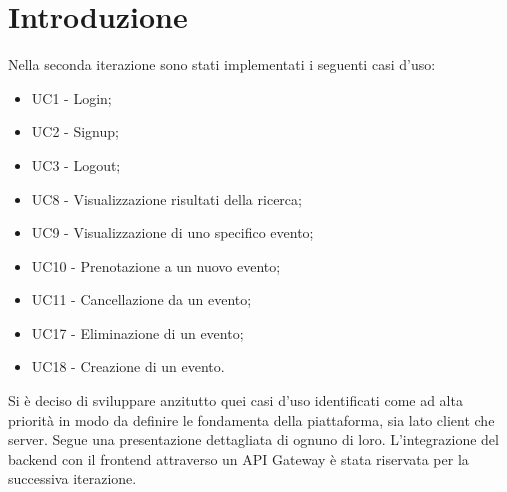 \section{Introduzione}
Nella seconda iterazione sono stati implementati i seguenti casi d'uso:
\begin{itemize}
	\item UC1 - Login;
	\item UC2 - Signup;
	\item UC3 - Logout;
	\item UC8 - Visualizzazione risultati della ricerca;
	\item UC9 - Visualizzazione di uno specifico evento;
	\item UC10 - Prenotazione a un nuovo evento;
	\item UC11 - Cancellazione da un evento;
	\item UC17 - Eliminazione di un evento;
	\item UC18 - Creazione di un evento.
\end{itemize}
Si è deciso di sviluppare anzitutto quei casi d'uso identificati come ad alta priorità in modo da definire le fondamenta della piattaforma, sia lato client che server. Segue una presentazione dettagliata di ognuno di loro.
L'integrazione del backend con il frontend attraverso un API Gateway è stata riservata per la successiva iterazione.
